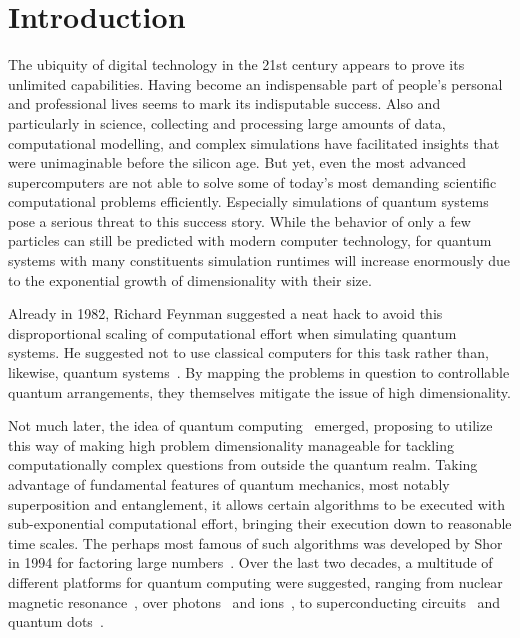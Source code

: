 \renewcommand{\imagepath}{../10-intro/img}

\chapter{Introduction}
The ubiquity of digital technology in the 21st century appears to prove its unlimited capabilities. Having become an indispensable part of people's personal and professional lives seems to mark its indisputable success. Also and particularly in science, collecting and processing large amounts of data, computational modelling, and complex simulations have facilitated insights that were unimaginable before the silicon age. But yet, even the most advanced supercomputers are not able to solve some of today's most demanding scientific computational problems efficiently. Especially simulations of quantum systems pose a serious threat to this success story. While the behavior of only a few particles can still be predicted with modern computer technology, for quantum systems with many constituents simulation runtimes will increase enormously due to the exponential growth of dimensionality with their size.

Already in 1982, Richard Feynman suggested a neat hack to avoid this disproportional scaling of computational effort when simulating quantum systems. He suggested not to use classical computers for this task rather than, likewise, quantum systems~\cite{feynman_simulating_1982}. By mapping the problems in question to controllable quantum arrangements, they themselves mitigate the issue of high dimensionality.

Not much later, the idea of quantum computing~\cite{nielsen_quantum_2010, hidary_quantum_2021, ladd_quantum_2010, mainzer_quantencomputer_2020} emerged, proposing to utilize this way of making high problem dimensionality manageable for tackling computationally complex questions from outside the quantum realm. Taking advantage of fundamental features of quantum mechanics, most notably superposition and entanglement, it allows certain algorithms to be executed with sub-exponential computational effort, bringing their execution down to reasonable time scales. The perhaps most famous of such algorithms was developed by Shor in 1994 for factoring large numbers~\cite{shor_algorithms_1994}. Over the last two decades, a multitude of different platforms for quantum computing were suggested, ranging from nuclear magnetic resonance~\cite{cory_ensemble_1997}, over photons~\cite{duan_scalable_2004,zhong_quantum_2020} and ions~\cite{home_complete_2009}, to superconducting circuits~\cite{dicarlo_demonstration_2009, arute_quantum_2019-1} and quantum dots~\cite{hanson_spins_2007}.

